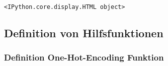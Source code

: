 \documentclass[paper=landscape]{scrartcl}
\begin{document}
    
    \begin{verbatim}
<IPython.core.display.HTML object>
    \end{verbatim}

    
    \hypertarget{definition-von-hilfsfunktionen}{%
\subsection{Definition von
Hilfsfunktionen}\label{definition-von-hilfsfunktionen}}

\hypertarget{definition-one-hot-encoding-funktion}{%
\subsubsection{Definition One-Hot-Encoding
Funktion}\label{definition-one-hot-encoding-funktion}}
\end{document}
